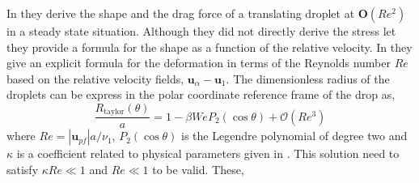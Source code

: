 In \citet{taylor1964deformation} they derive the shape and the drag force of a translating droplet at $\textbf{O}(Re^2)$ in a steady state situation. 
Although they did not directly derive the stress let they provide a formula for the shape as a function of the relative velocity. 
In \citet{taylor1964deformation} they give an explicit formula for the deformation in terms of the Reynolds number $Re$ based on the relative velocity fields, $\textbf{u}_\alpha - \textbf{u}_1$. 
The dimensionless radius of the droplets can be express in the polar coordinate reference frame of the drop as, 
\begin{equation*}
    \frac{R_\text{taylor}(\theta)}{a} = 1 - \beta \textit{We} P_2(\cos\theta)
    + \mathcal{O}(Re^3)
\end{equation*}
where $Re = |\textbf{u}_{pf}| a /\nu_1$, $P_2(\cos\theta)$ is the Legendre polynomial of degree two and $\kappa$ is a coefficient related to physical parameters given in \citet{taylor1964deformation}.  
This solution need to satisfy $\kappa Re \ll 1$ and $Re \ll 1$ to be valid. 
These, 
